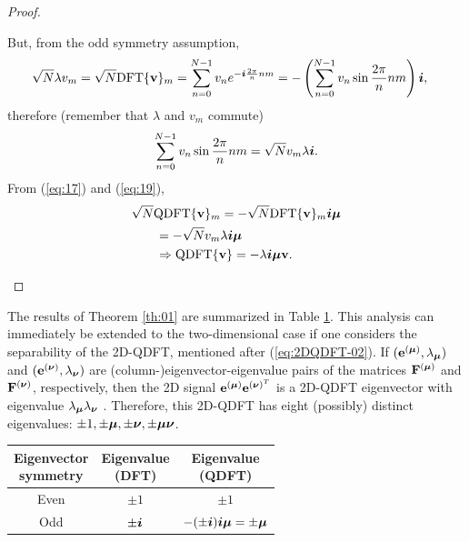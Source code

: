 \begin{proof}
\begin{itemize}
But, from the odd symmetry assumption,
\begin{equation}
\begin{aligned}
\sqrt{N}\lambda v_m = \sqrt{N}\text{DFT}\{ \mathbf{v} \}_m &= \sum_{n=0}^{N-1} v_n e^{-\boldsymbol{i} \frac{2\pi}{n} nm}= - \left(  \sum_{n=0}^{N-1} v_n \sin \frac{2\pi}{n} nm \right) \boldsymbol{i},
\end{aligned}
\end{equation}
therefore (remember that $ \lambda $ and $ v_m $ commute)
\begin{equation}
\label{eq:19}
\sum_{n=0}^{N-1} v_n \sin \frac{2\pi}{n} nm = \sqrt{N}v_m \lambda \boldsymbol{i}.
\end{equation}
From (\ref{eq:17}) and (\ref{eq:19}),
\begin{equation}
\label{eq:20}
\begin{aligned}
\sqrt{N}\text{QDFT}\{ \mathbf{v} \}_m &=  -\sqrt{N}\text{DFT} \{ \mathbf{v} \}_m \qi \qmu \\
&\hspace{\correctinghspace}
= -\sqrt{N}v_m \lambda \qi \qmu \\
&\hspace{\correctinghspace}
\Rightarrow \text{QDFT}\{ \mathbf{v} \} = -\lambda \qi \qmu \mathbf{v}.
\end{aligned}
\end{equation}
\end{itemize}
\end{proof}

The results of Theorem \ref{th:01} are summarized in Table \ref{tab:01}.
This analysis can immediately be extended to the two-dimensional case if one considers the separability of the 2D-QDFT, mentioned after (\ref{eq:2DQDFT-02}). If $ (\mathbf{e}^{(\boldsymbol{\mu})}, \lambda_{\boldsymbol{\mu}}) $ and $ (\mathbf{e}^{(\boldsymbol{\nu})}, \lambda_{\boldsymbol{\nu}}) $ are (column-)eigenvector-eigenvalue pairs of the matrices $ \mathbf{F}^{(\boldsymbol{\mu})} $ and $ \mathbf{F}^{(\boldsymbol{\nu})} $, respectively, then the 2D signal $ \mathbf{e}^{(\boldsymbol{\mu})} \mathbf{e}^{(\boldsymbol{\nu})^T}  $ is a 2D-QDFT eigenvector with eigenvalue $ \lambda_{\boldsymbol{\mu}} \lambda_{\boldsymbol{\nu}} $ \cite{candan2011}. Therefore, this 2D-QDFT has eight (possibly) distinct eigenvalues: $ \pm 1, \pm \boldsymbol{\mu}, \pm \boldsymbol{\nu}, \pm \boldsymbol{\mu} \boldsymbol{\nu} $.

\begin{table}[b!]
\center
{}
\label{tab:01}
\begin{tabular}{ccc}
\toprule
\shortstack{Eigenvector\\ symmetry} & \shortstack{Eigenvalue\\(DFT)} & \shortstack{Eigenvalue\\(QDFT)} \\
\midrule
Even & $ \pm 1 $ & $ \pm 1 $ \\
Odd & $ \pm \boldsymbol{i} $ & $ - (\pm \boldsymbol{i}) \boldsymbol{i} \boldsymbol{\mu} = \pm \boldsymbol{\mu} $\\
\bottomrule
\end{tabular}
\end{table}


